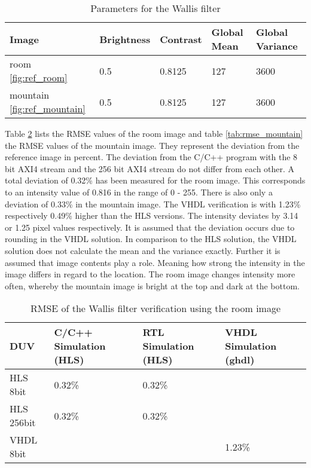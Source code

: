 \begin{table}[tb!]
    \centering
    \begin{tabular}{l l l l l}
        \toprule
        Image & Brightness & Contrast & Global Mean & Global Variance \\
        \midrule
        room \ref{fig:ref_room} & 0.5 & 0.8125 & 127 & 3600 \\
        mountain \ref{fig:ref_mountain} & 0.5 & 0.8125 & 127 & 3600 \\
        \bottomrule
    \end{tabular}
    \caption{Parameters for the Wallis filter}
    \label{tab:parameter}
\end{table}



Table \ref{tab:rmse_room} lists the RMSE values of the room image and table 
\ref{tab:rmse_mountain} the RMSE
values of the mountain image. They
represent the deviation from the reference image in percent. The deviation from
the C/C++ program with the 8 bit AXI4 stream and the 256 bit AXI4 stream do
not differ from each other. A total deviation of 0.32\% has been measured for
the
room image. This corresponds to an intensity value of 0.816 in the range of 0 -
255. There is also only a deviation of 0.33\% in the mountain image. The VHDL
verification is with 1.23\% respectively 0.49\% higher than the
HLS versions. The intensity deviates by 3.14 or 1.25 pixel values respectively.
It is assumed that the deviation occurs due to rounding in the VHDL solution. In
comparison to the HLS solution, the VHDL solution does not calculate the mean
and the variance exactly. Further it is assumed that image contents play a
role. Meaning how strong the intensity in the image differs in regard to the
location. The room image changes intensity more often, whereby the mountain
image is bright at the top and dark at the bottom.

\begin{table}[tb!]
    \centering
    \begin{tabular}{l l l l}
        \toprule
        DUV & C/C++ Simulation (HLS) & RTL Simulation (HLS) & VHDL Simulation (ghdl) \\
        \midrule
        HLS  8bit    & 0.32\%    & 0.32\%    & {}\\
        HLS  256bit  & 0.32\%    & 0.32\%    & {} \\
        VHDL 8bit        & {}         & {}         & 1.23\% \\
        \bottomrule
    \end{tabular}
    \caption{RMSE of the Wallis filter verification using the room image}
    \label{tab:rmse_room}
\end{table}

